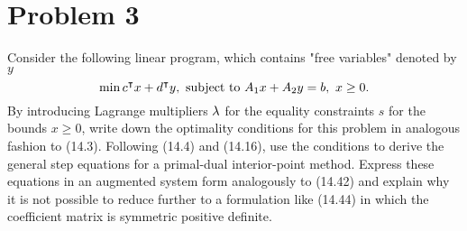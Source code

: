 \section{Problem 3}
Consider the following linear program, which contains "free variables" denoted by $y$
\[\min c^{\intercal} x + d^{\intercal} y, \text{ subject to } A_1x + A_2y = b, \ x \geq 0.\]
By introducing Lagrange multipliers $\mathrm{\lambda}$ for the equality constraints $s$ for the bounds $x \geq 0$, write down the optimality conditions for this problem in analogous fashion to (14.3). Following (14.4) and (14.16), use the conditions to derive the general step equations for a primal-dual interior-point method. Express these equations in an augmented system form analogously to (14.42) and explain why it is not possible to reduce further to a formulation like (14.44) in which the coefficient matrix is symmetric positive definite. 
\partbreak
